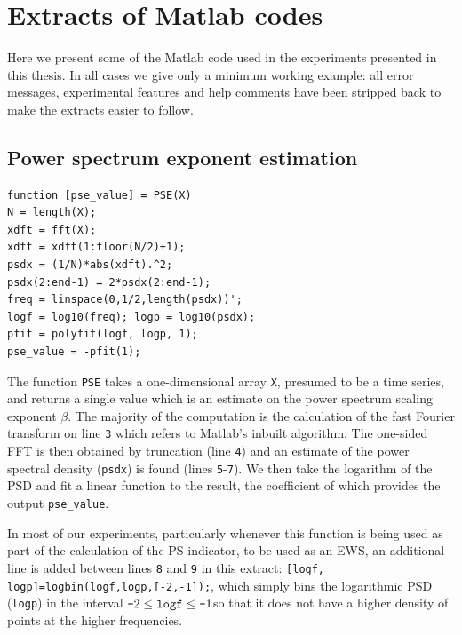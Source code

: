 
\chapter{Extracts of Matlab codes}
\label{appendix:code}

Here we present some of the Matlab code used in the experiments presented in this thesis. In all cases we give only a minimum working example: all error messages, experimental features and help comments have been stripped back to make the extracts easier to follow.


\section{Power spectrum exponent estimation}
\label{appendix:PSexponent}
\lstset{language=Matlab, numbers=left, numberstyle=\tiny, framexleftmargin=7mm, frame=single, basicstyle=\ttfamily}
\begin{lstlisting}
function [pse_value] = PSE(X)
N = length(X);
xdft = fft(X);
xdft = xdft(1:floor(N/2)+1);
psdx = (1/N)*abs(xdft).^2;
psdx(2:end-1) = 2*psdx(2:end-1);
freq = linspace(0,1/2,length(psdx))';
logf = log10(freq); logp = log10(psdx);
pfit = polyfit(logf, logp, 1);
pse_value = -pfit(1);
\end{lstlisting}
The function \texttt{PSE} takes a one-dimensional array \texttt{X}, presumed to be a time series, and returns a single value which is an estimate on the power spectrum scaling exponent $\beta$. The majority of the computation is the calculation of the fast Fourier transform on line \texttt{3} which refers to Matlab's inbuilt algorithm. The one-sided FFT is then obtained by truncation (line \texttt{4}) and an estimate of the power spectral density (\texttt{psdx}) is found (lines \texttt{5}-\texttt{7}). We then take the logarithm of the PSD and fit a linear function to the result, the coefficient of which provides the output \texttt{pse\_value}.

In most of our experiments, particularly whenever this function is being used as part of the calculation of the PS indicator, to be used as an EWS, an additional line is added between lines \texttt{8} and \texttt{9} in this extract: \texttt{[logf, logp]=logbin(logf,logp,[-2,-1]);}, which simply bins the logarithmic PSD (\texttt{logp}) in the interval $\textup{\texttt{-}}2\leq\texttt{logf}\leq\textup{\texttt{-}}1$so that it does not have a higher density of points at the higher frequencies.

